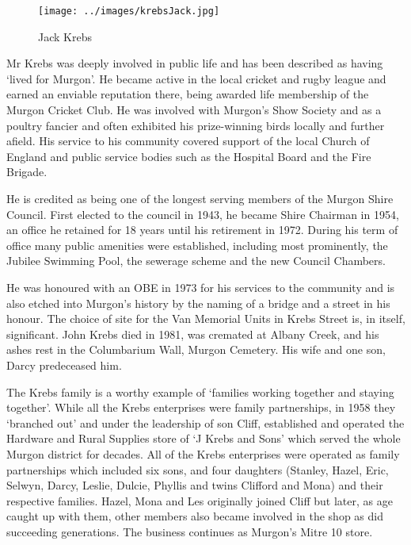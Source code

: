 \begin{figure}
\begin{center}
\texttt{[image: ../images/krebsJack.jpg]}
\caption{Jack Krebs}
\end{center}
\end{figure}




Mr Krebs was deeply involved in public life and has been described as having `lived for Murgon'. He became active in the local cricket and rugby league and earned an enviable reputation there, being awarded life membership of the Murgon Cricket Club. He was involved with Murgon's Show Society and as a poultry fancier and often exhibited his prize-winning birds locally and further afield. His service to his community covered support of the local Church of England and public service bodies such as the Hospital Board and the Fire Brigade.



He is credited as being one of the longest serving members of the Murgon Shire Council. First elected to the council in 1943, he became Shire Chairman in 1954, an office he retained for 18 years until his retirement in 1972. During his term of office many public amenities were established, including most prominently, the Jubilee Swimming Pool, the sewerage scheme and the new Council Chambers.



He was honoured with an OBE in 1973 for his services to the community and is also etched into Murgon's history by the naming of a bridge and a street in his honour. The choice of site for the Van Memorial Units in Krebs Street is, in itself, significant. John Krebs died in 1981, was cremated at Albany Creek, and his ashes rest in the Columbarium Wall, Murgon Cemetery. His wife and one son, Darcy predeceased him.



The Krebs family is a worthy example of `families working together and staying together'. While all the Krebs enterprises were family partnerships, in 1958 they `branched out' and under the leadership of son Cliff, established and operated the Hardware and Rural Supplies store of `J Krebs and Sons' which served the whole Murgon district for decades. All of the Krebs enterprises were operated as family partnerships which included six sons, and four daughters (Stanley, Hazel, Eric, Selwyn, Darcy, Leslie, Dulcie, Phyllis and twins Clifford and Mona) and their respective families. Hazel, Mona and Les originally joined Cliff but later, as age caught up with them, other members also became involved in the shop as did succeeding generations. The business continues as Murgon's Mitre 10 store.









